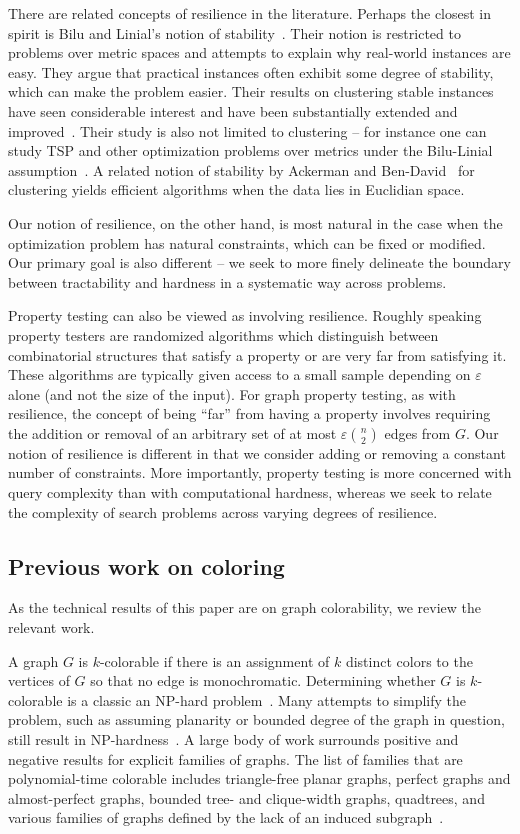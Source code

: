 \documentclass[10pt]{article}
\begin{document}
There are related concepts of resilience in the literature. Perhaps the closest
in spirit is Bilu and Linial's notion of stability~\cite{BL12}.  Their notion
is restricted to problems over metric spaces and attempts to explain why
real-world instances are easy.  They argue that practical instances often
exhibit some degree of stability, which can make the problem easier.  Their
results on clustering stable instances have seen considerable interest and have
been substantially extended and improved~\cite{ABS10,BL12,Rey11}.  Their study
is also not limited to clustering -- for instance one can study TSP and other
optimization problems over metrics under the Bilu-Linial
assumption~\cite{MSSW11}.  
A related notion of stability by 
Ackerman and Ben-David~\cite{AckermanB09} for clustering 
yields efficient algorithms when the data lies in Euclidian space.

Our notion of resilience, on the other hand, is most natural in the case when
the optimization problem has natural constraints, which can be fixed or
modified.  Our primary goal is also different -- we seek to more finely
delineate the boundary between tractability and hardness in a systematic way
across problems.

Property testing can also be viewed as involving resilience. Roughly speaking
property testers are randomized algorithms which distinguish between
combinatorial structures that satisfy a property or are very far from satisfying
it. These algorithms are typically given access to a small sample depending on
$\varepsilon$ alone (and not the size of the input). For graph property testing,
as with resilience, the concept of being ``far'' from having a property involves
requiring the addition or removal of an arbitrary set of at most $\varepsilon
\binom{n}{2}$ edges from $G$. Our notion of resilience is different in that we
consider adding or removing a constant number of constraints. More importantly,
property testing is more concerned with query complexity than with
computational hardness, whereas we seek to relate the
complexity of search problems across varying degrees of resilience. 

\subsection{Previous work on coloring}

As the technical results of this paper are on graph colorability, we review
the relevant work.

A graph $G$ is $k$-colorable if there is an assignment of $k$ distinct colors
to the vertices of $G$ so that no edge is monochromatic. Determining whether
$G$ is $k$-colorable is a classic an NP-hard problem~\cite{Karp72}. Many 
attempts to simplify the problem, such as assuming planarity or bounded degree
of the graph in question, still result in NP-hardness~\cite{Dailey80}. A large
body of work surrounds positive and negative results for explicit families of
graphs. The list of families that are polynomial-time colorable includes
triangle-free planar graphs, perfect graphs and almost-perfect graphs, bounded
tree- and clique-width graphs, quadtrees, and various families of graphs
defined by the lack of an induced
subgraph~\cite{HMM10,Ko03,EBH99,Cai03,KKTW01}.
\end{document}
